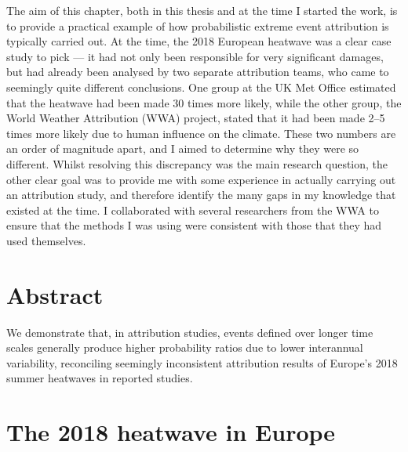   The aim of this chapter, both in this thesis and at the time I started the work, is to provide a practical example of how probabilistic extreme event attribution is typically carried out. At the time, the 2018 European heatwave was a clear case study to pick --- it had not only been responsible for very significant damages, but had already been analysed by two separate attribution teams, who came to seemingly quite different conclusions. One group at the UK Met Office estimated that the heatwave had been made 30 times more likely, while the other group, the World Weather Attribution (WWA) project, stated that it had been made 2--5 times more likely due to human influence on the climate. These two numbers are an order of magnitude apart, and I aimed to determine why they were so different.  Whilst resolving this discrepancy was the main research question, the other clear goal was to provide me with some experience in actually carrying out an attribution study, and therefore identify the many gaps in my knowledge that existed at the time. I collaborated with several researchers from the WWA to ensure that the methods I was using were consistent with those that they had used themselves. 

\section{Abstract}

  We demonstrate that, in attribution studies, events defined over longer time scales generally produce higher probability ratios due to lower interannual variability, reconciling seemingly inconsistent attribution results of Europe's 2018 summer heatwaves in reported studies.

\section{The 2018 heatwave in Europe}

